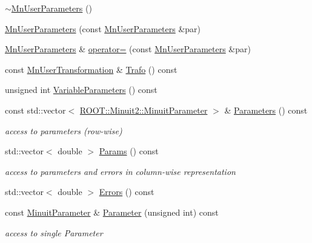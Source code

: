 \begin{DoxyCompactItemize}
\item 
\mbox{\hyperlink{classROOT_1_1Minuit2_1_1MnUserParameters_a3b2d1f74827108c7dc34a5eb879dcc24}{$\sim$\+Mn\+User\+Parameters}} ()
\item 
\mbox{\hyperlink{classROOT_1_1Minuit2_1_1MnUserParameters_aa4ba65a64a5dd051fecc3366c8e10617}{Mn\+User\+Parameters}} (const \mbox{\hyperlink{classROOT_1_1Minuit2_1_1MnUserParameters}{Mn\+User\+Parameters}} \&par)
\item 
\mbox{\hyperlink{classROOT_1_1Minuit2_1_1MnUserParameters}{Mn\+User\+Parameters}} \& \mbox{\hyperlink{classROOT_1_1Minuit2_1_1MnUserParameters_a21d8a1f70098c2c9c82015cf0867c8ea}{operator=}} (const \mbox{\hyperlink{classROOT_1_1Minuit2_1_1MnUserParameters}{Mn\+User\+Parameters}} \&par)
\item 
const \mbox{\hyperlink{classROOT_1_1Minuit2_1_1MnUserTransformation}{Mn\+User\+Transformation}} \& \mbox{\hyperlink{classROOT_1_1Minuit2_1_1MnUserParameters_ac5c3bff96b6fc41a790005f524e334db}{Trafo}} () const
\item 
unsigned int \mbox{\hyperlink{classROOT_1_1Minuit2_1_1MnUserParameters_af19ee84626fbdeb819e6a86e82794f19}{Variable\+Parameters}} () const
\item 
const std\+::vector$<$ \mbox{\hyperlink{classROOT_1_1Minuit2_1_1MinuitParameter}{R\+O\+O\+T\+::\+Minuit2\+::\+Minuit\+Parameter}} $>$ \& \mbox{\hyperlink{classROOT_1_1Minuit2_1_1MnUserParameters_a0ca783762d29fc6e9fa2c7b162f044f4}{Parameters}} () const
\begin{DoxyCompactList}\small\item\em access to parameters (row-\/wise) \end{DoxyCompactList}\item 
std\+::vector$<$ double $>$ \mbox{\hyperlink{classROOT_1_1Minuit2_1_1MnUserParameters_a68a7baf5aa9548c8dd90142327b27218}{Params}} () const
\begin{DoxyCompactList}\small\item\em access to parameters and errors in column-\/wise representation \end{DoxyCompactList}\item 
std\+::vector$<$ double $>$ \mbox{\hyperlink{classROOT_1_1Minuit2_1_1MnUserParameters_abcc81c5cff7f9af0d10e2622c5d715c7}{Errors}} () const
\item 
const \mbox{\hyperlink{classROOT_1_1Minuit2_1_1MinuitParameter}{Minuit\+Parameter}} \& \mbox{\hyperlink{classROOT_1_1Minuit2_1_1MnUserParameters_a13bfc3bb154a2e8974fb20e9524b96da}{Parameter}} (unsigned int) const
\begin{DoxyCompactList}\small\item\em access to single Parameter \end{DoxyCompactList}\item 

\end{DoxyCompactItemize}
